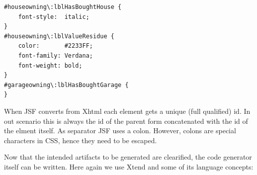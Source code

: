 \begin{lstlisting}[language=HTML]
#houseowning\:lblHasBoughtHouse {
	font-style:  italic; 	
}
#houseowning\:lblValueResidue {
	color:       #2233FF; 
	font-family: Verdana; 	
	font-weight: bold; 		
}
#garageowning\:lblHasBoughtGarage {
}
\end{lstlisting}

When JSF converts from Xhtml each element gets a unique (full qualified) id. In
out scenario this is always the id of the parent form concatenated with the id of
the elment itself. As separator JSF uses a colon. However, colons are special characters
in CSS, hence they need to be escaped.

Now that the intended artifacts to be generated are clearified, the code generator
itself can be written. Here again we use Xtend and some of its language concepts:

